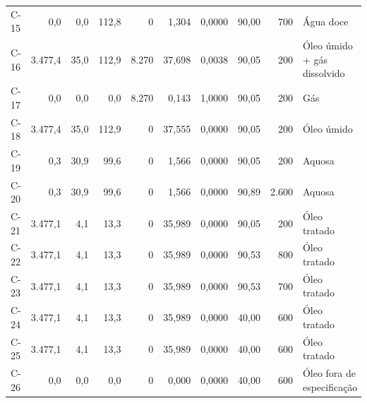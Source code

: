 \documentclass[11pt,a4paper]{article}
\numberwithin{equation}{section}
\numberwithin{table}{section}
\numberwithin{figure}{section}
\begin{document}
{\begin{longtable}{lrrrrrrrrL{2.5cm}}
C-15 & 0,0 & 0,0 & 112,8 & 0 & 1,304 & 0,0000 & 90,00 & 700 & {\scriptsize Água doce}\\
C-16 & 3.477,4 & 35,0 & 112,9 & 8.270 & 37,698 & 0,0038 & 90,05 & 200 & {\scriptsize Óleo úmido + gás dissolvido}\\
C-17 & 0,0 & 0,0 & 0,0 & 8.270 & 0,143 & 1,0000 & 90,05 & 200 & {\scriptsize Gás}\\
C-18 & 3.477,4 & 35,0 & 112,9 & 0 & 37,555 & 0,0000 & 90,05 & 200 & {\scriptsize Óleo úmido}\\
C-19 & 0,3 & 30,9 & 99,6 & 0 & 1,566 & 0,0000 & 90,05 & 200 & {\scriptsize Aquosa}\\
C-20 & 0,3 & 30,9 & 99,6 & 0 & 1,566 & 0,0000 & 90,89 & 2.600 & {\scriptsize Aquosa}\\
C-21 & 3.477,1 & 4,1 & 13,3 & 0 & 35,989 & 0,0000 & 90,05 & 200 & {\scriptsize Óleo tratado}\\
C-22 & 3.477,1 & 4,1 & 13,3 & 0 & 35,989 & 0,0000 & 90,53 & 800 & {\scriptsize Óleo tratado}\\
C-23 & 3.477,1 & 4,1 & 13,3 & 0 & 35,989 & 0,0000 & 90,53 & 700 & {\scriptsize Óleo tratado}\\
C-24 & 3.477,1 & 4,1 & 13,3 & 0 & 35,989 & 0,0000 & 40,00 & 600 & {\scriptsize Óleo tratado}\\
C-25 & 3.477,1 & 4,1 & 13,3 & 0 & 35,989 & 0,0000 & 40,00 & 600 & {\scriptsize Óleo tratado}\\
C-26 & 0,0 & 0,0 & 0,0 & 0 & 0,000 & 0,0000 & 40,00 & 600 & {\scriptsize Óleo fora de especificação}\\
\bottomrule\end{longtable}}
\end{document}
